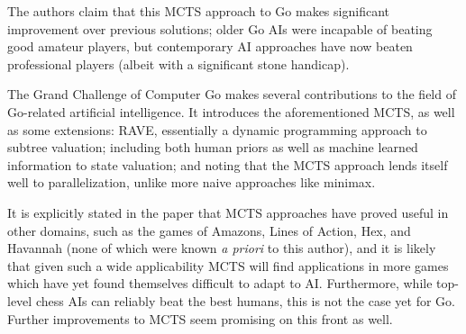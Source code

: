 \documentclass[12pt]{article}
\begin{document}
\problemsub %

The authors claim that this MCTS approach to Go makes significant improvement over previous solutions; older Go AIs were
incapable of beating good amateur players, but contemporary AI approaches have now beaten professional players (albeit
with a significant stone handicap).



\problemsub %

The Grand Challenge of Computer Go makes several contributions to the field of Go-related artificial intelligence. It
introduces the aforementioned MCTS, as well as some extensions: RAVE, essentially a dynamic programming approach to
subtree valuation; including both human priors as well as machine learned information to state valuation; and noting
that the MCTS approach lends itself well to parallelization, unlike more naive approaches like minimax.



\problemsub %

It is explicitly stated in the paper that MCTS approaches have proved useful in other domains, such as the games of
Amazons, Lines of Action, Hex, and Havannah (none of which were known \textit{a priori} to this author), and it is
likely that given such a wide applicability MCTS will find applications in more games which have yet found themselves
difficult to adapt to AI. Furthermore, while top-level chess AIs can reliably beat the best humans, this is not the case
yet for Go. Further improvements to MCTS seem promising on this front as well.
\end{document}
